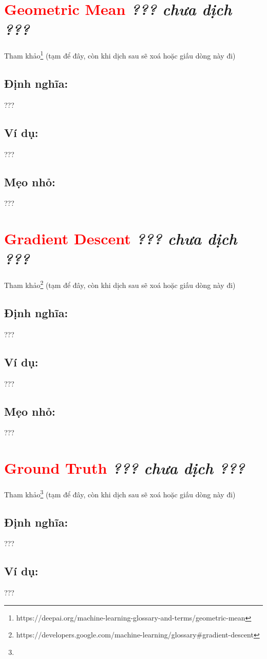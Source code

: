 \section*{\huge \textcolor{Red}{Geometric Mean}  \small \textit{??? chưa dịch ???} }
Tham khảo\footnote{https://deepai.org/machine-learning-glossary-and-terms/geometric-mean} (tạm để đây, còn khi dịch sau sẽ xoá hoặc giấu dòng này đi)
\subsection*{Định nghĩa:}
???
\subsection*{Ví dụ:}
???
\subsection*{Mẹo nhỏ:}
???
\section*{\huge \textcolor{Red}{Gradient Descent}  \small \textit{??? chưa dịch ???} }
Tham khảo\footnote{https://developers.google.com/machine-learning/glossary\#gradient-descent} (tạm để đây, còn khi dịch sau sẽ xoá hoặc giấu dòng này đi)
\subsection*{Định nghĩa:}
???
\subsection*{Ví dụ:}
???
\subsection*{Mẹo nhỏ:}
???
\section*{\huge \textcolor{Red}{Ground Truth}  \small \textit{??? chưa dịch ???} }
Tham khảo\footnote{} (tạm để đây, còn khi dịch sau sẽ xoá hoặc giấu dòng này đi)
\subsection*{Định nghĩa:}
???
\subsection*{Ví dụ:}
???
